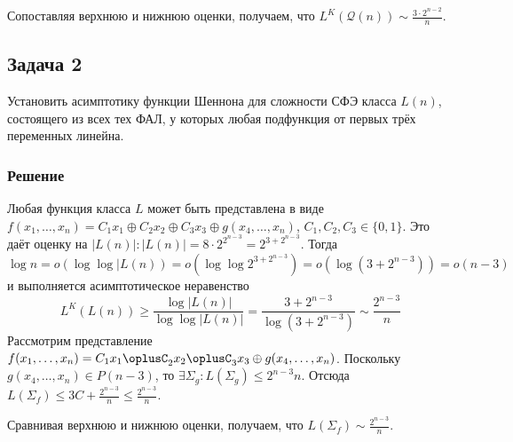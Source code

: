 \documentclass[11pt]{article}
\newcounter{th}\setcounter{th}{0}
\begin{document}
Сопоставляя верхнюю и нижнюю оценки, получаем, что \(L^K(\mathcal{Q}(n)) \sim \frac{3\cdot2^{n - 2}}n\).
\subsection{Задача 2}
\label{sec:orgb11e4ed}
Установить асимптотику функции Шеннона для сложности СФЭ класса \(L(n)\), состоящего из всех тех ФАЛ, у
которых любая подфункция от первых трёх переменных линейна.
\subsubsection{Решение}
\label{sec:org8ca7be9}
Любая функция класса \(L\) может быть представлена в виде
\(f(x_1, \ldots, x_n) = C_1x_1 \oplus C_2x_2 \oplus C_3x_3 \oplus g(x_4, \ldots, x_n)\),
\(C_1, C_2, C_3 \in \{0, 1\}\).
Это даёт оценку на \(|L(n)|: |L(n)| = 8\cdot2^{2^{n - 3}} = 2^{3 + 2^{n - 3}}\). Тогда
\begin{equation*}
\log n = o(\log\log|L(n)) = o(\log\log2^{3 + 2^{n - 3}}) = o(\log(3 + 2^{n - 3})) = o(n - 3)
\end{equation*}
и выполняется асимптотическое неравенство
\begin{equation*}
L^K(L(n)) \geq \frac{\log|L(n)|}{\log\log|L(n)|} = \frac{3 + 2^{n - 3}}{\log (3 + 2^{n - 3})}
\sim \frac{2^{n - 3}}n
\end{equation*}
Рассмотрим представление
\(f(x_1, \ldots, x_n) = C_1x_1\oplusC_2x_2\oplusC_3x_3\oplus g(x_4, \ldots, x_n)\). Поскольку
\(g(x_4, \ldots, x_n) \in P(n - 3)\), то \(\exists \Sigma_g: L(\Sigma_g) \leq 2^{n - 3}n\). Отсюда
\(L(\Sigma_f) \leq 3C + \frac{2^{n - 3}}n \leq \frac{2^{n - 3}}n\).

Сравнивая верхнюю и нижнюю оценки, получаем, что \(L(\Sigma_f) \sim \frac{2^{n - 3}}n\).
\end{document}
